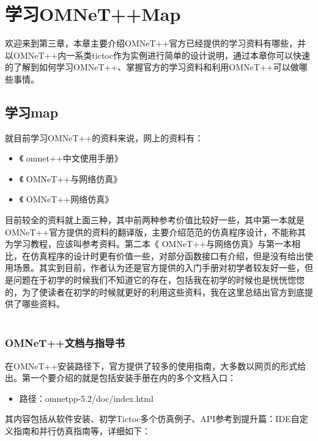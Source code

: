 \chapter{学习OMNeT++Map}

\begin{summary}
欢迎来到第三章，本章主要介绍OMNeT++官方已经提供的学习资料有哪些，并以OMNeT++内一系类tictoc作为实例进行简单的设计说明，通过本章你可以快速的了解到如何学习OMNeT++、掌握官方的学习资料和利用OMNeT++可以做哪些事情。\\
\end{summary}

\section{学习map}
就目前学习OMNeT++的资料来说，网上的资料有：
\begin{itemize}
	\item 《 omnet++中文使用手册》
	\item 《 OMNeT++与网络仿真》
	\item 《 OMNeT++网络仿真》 
\end{itemize}

目前较全的资料就上面三种，其中前两种参考价值比较好一些，其中第一本就是OMNeT++官方提供的资料的翻译版，主要介绍范范的仿真程序设计，不能称其为学习教程，应该叫参考资料。第二本《 OMNeT++与网络仿真》与第一本相比，在仿真程序的设计时更有价值一些，对部分函数接口有介绍，但是没有给出使用场景。其实到目前，作者认为还是官方提供的入门手册对初学者较友好一些，但是问题在于初学的时候我们不知道它的存在，包括我在初学的时候也是恍恍惚惚的，为了使读者在初学的时候就更好的利用这些资料，我在这里总结出官方到底提供了哪些资料。\\ \\

\subsection{OMNeT++文档与指导书}
在OMNeT++安装路径下，官方提供了较多的使用指南，大多数以网页的形式给出。第一个要介绍的就是包括安装手册在内的多个文档入口：

\begin{itemize}
\item 路径：omnetpp-5.2/doc/index.html
\end{itemize}

其内容包括从软件安装、初学Tictoc多个仿真例子、API参考到提升篇：IDE自定义指南和并行仿真指南等，详细如下：\\

